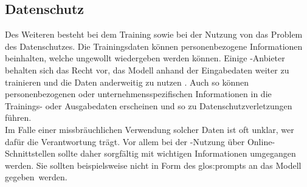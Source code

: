 \documentclass[../main.tex]{subfiles}
\begin{document}
\subsection{Datenschutz}
\label{sec:datenschutz}

Des Weiteren besteht bei dem Training sowie bei der Nutzung von  das Problem des Datenschutzes. Die Trainingsdaten können personenbezogene Informationen beinhalten, welche ungewollt 
wiedergeben werden können. Einige -Anbieter behalten sich das Recht vor, das Modell anhand der 
Eingabedaten weiter zu trainieren und die Daten anderweitig zu nutzen \cite{OpenAI_Datenschutzerklaerung_2025,MistralAI_Terms_2025}. Auch so können personenbezogenen oder unternehmensspezifischen Informationen in die Trainings- oder Ausgabedaten 
erscheinen und so zu Datenschutzverletzungen führen.\\ Im Falle einer missbräuchlichen Verwendung solcher Daten ist oft unklar, wer dafür die Verantwortung trägt. Vor allem bei der -Nutzung 
über Online-Schnittstellen sollte daher sorgfältig mit wichtigen Informationen umgegangen werden. Sie sollten beispielsweise nicht in Form des \gls{glos:prompt}s an das Modell \mbox{gegeben werden. \cite{datenschute}}
\end{document}
